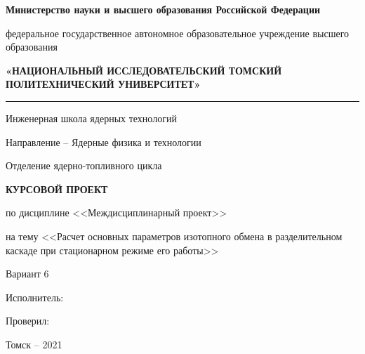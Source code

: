 \thispagestyle{empty}
\begin{center}
\textbf{Министерство науки и высшего образования Российской Федерации}

федеральное государственное автономное образовательное учреждение высшего образования

\textbf{«НАЦИОНАЛЬНЫЙ ИССЛЕДОВАТЕЛЬСКИЙ ТОМСКИЙ ПОЛИТЕХНИЧЕСКИЙ УНИВЕРСИТЕТ»}
\noindent\rule{\textwidth}{1pt}
\end{center}

\noindent Инженерная школа ядерных технологий

\noindent Направление -- Ядерные физика и технологии

\noindent Отделение ядерно-топливного цикла

\vspace{5em}
\begin{center}
\textbf{КУРСОВОЙ ПРОЕКТ}

по дисциплине <<Междисциплинарный проект>>

на тему <<Расчет основных параметров изотопного обмена в разделительном
каскаде при стационарном режиме его работы>>

Вариант 6
\end{center}
\vspace{5em}
\noindent Исполнитель:
\vspace{2em}

\noindent Проверил:

\vspace{9em}
\begin{center}
Томск -- 2021
\end{center}
\newpage
